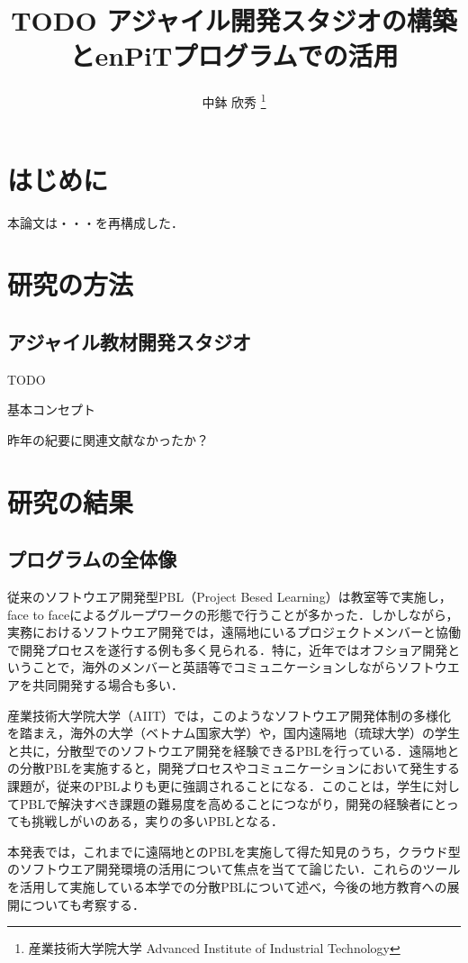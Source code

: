 \documentclass[a4j, 12Q, twocolumn, twoside]{jsarticle}
\title{TODO アジャイル開発スタジオの構築とenPiTプログラムでの活用}
\author{
  中鉢 欣秀
  \thanks{産業技術大学院大学 \newline
  Advanced Institute of Industrial Technology}
}
\begin{document}
\amaketitle[-1pt]

\section{はじめに}

本論文は・・・を再構成した．
\section{研究の方法}
\subsection{アジャイル教材開発スタジオ}
TODO

基本コンセプト

昨年の紀要に関連文献なかったか？

\section{研究の結果}
\subsection{プログラムの全体像}
従来のソフトウエア開発型PBL（Project Besed Learning）は教室等で実施し，face to faceによるグループワークの形態で行うことが多かった．しかしながら，実務におけるソフトウエア開発では，遠隔地にいるプロジェクトメンバーと協働で開発プロセスを遂行する例も多く見られる．特に，近年ではオフショア開発ということで，海外のメンバーと英語等でコミュニケーションしながらソフトウエアを共同開発する場合も多い．

産業技術大学院大学（AIIT）では，このようなソフトウエア開発体制の多様化を踏まえ，海外の大学（ベトナム国家大学）や，国内遠隔地（琉球大学）の学生と共に，分散型でのソフトウエア開発を経験できるPBLを行っている．遠隔地との分散PBLを実施すると，開発プロセスやコミュニケーションにおいて発生する課題が，従来のPBLよりも更に強調されることになる．このことは，学生に対してPBLで解決すべき課題の難易度を高めることにつながり，開発の経験者にとっても挑戦しがいのある，実りの多いPBLとなる．

本発表では，これまでに遠隔地とのPBLを実施して得た知見のうち，クラウド型のソフトウエア開発環境の活用について焦点を当てて論じたい．これらのツールを活用して実施している本学での分散PBLについて述べ，今後の地方教育への展開についても考察する．
\end{document}
